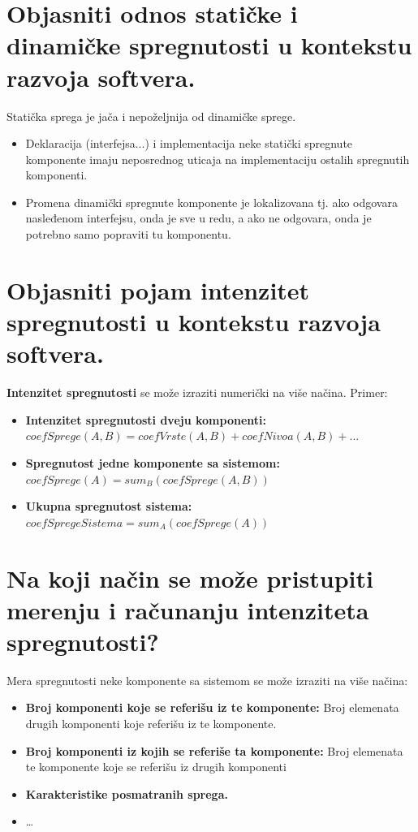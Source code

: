 \documentclass[a4paper]{article}
\begin{document}
\section{Objasniti odnos statičke i dinamičke spregnutosti u kontekstu razvoja softvera.}
  Statička sprega je jača i nepoželjnija od dinamičke sprege. 
  \begin{itemize}
    \item Deklaracija (interfejsa...) i implementacija neke statički spregnute komponente
          imaju neposrednog uticaja na implementaciju ostalih spregnutih komponenti.
    \item Promena dinamički spregnute komponente je lokalizovana tj. ako
          odgovara nasleđenom interfejsu, onda je sve u redu, a ako ne odgovara,
          onda je potrebno samo popraviti tu komponentu.
  \end{itemize}

\section{Objasniti pojam intenzitet spregnutosti u kontekstu razvoja softvera.}
  \textbf{Intenzitet spregnutosti} se može izraziti numerički na više načina. Primer:
  \begin{itemize}
    \item \textbf{Intenzitet spregnutosti dveju komponenti:}\\
          $coefSprege(A,B) = coefVrste(A,B) + coefNivoa(A,B) + ...$
    \item \textbf{Spregnutost jedne komponente sa sistemom:}\\
          $ coefSprege(A) = sum_{B}(coefSprege(A,B))$
    \item \textbf{Ukupna spregnutost sistema:}\\
          $coefSpregeSistema = sum_{A}(coefSprege(A))$
  \end{itemize} 

\section{Na koji način se može pristupiti merenju i računanju intenziteta spregnutosti?}
  Mera spregnutosti neke komponente sa sistemom se može izraziti na više načina:
  \begin{itemize}
    \item \textbf{Broj komponenti koje se referišu iz te komponente:} Broj elemenata drugih komponenti  
          koje referišu iz te komponente.
    \item \textbf{Broj komponenti iz kojih se referiše ta komponente:} Broj elemenata te komponente koje
          se referišu iz drugih komponenti
    \item \textbf{Karakteristike posmatranih sprega.}
    \item \dots
  \end{itemize}
\end{document}
